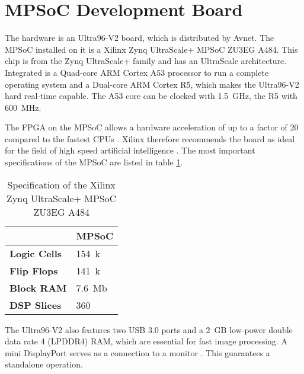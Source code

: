 \section{MPSoC Development Board}
\label{sec:board}

The hardware is an Ultra96-V2 board, which is distributed by Avnet.
The MPSoC installed on it is a Xilinx Zynq UltraScale+ MPSoC ZU3EG A484.
This chip is from the Zynq UltraScale+ family and has an UltraScale architecture.
Integrated is a Quad-core ARM Cortex A53 processor to run a complete operating system and a Dual-core ARM Cortex R5, which makes the Ultra96-V2 hard real-time capable.
The A53 core can be clocked with \SI{1.5}{GHz}, the R5 with \SI{600}{MHz}.

The FPGA on the MPSoC allows a hardware acceleration of up to a factor of 20 compared to the fastest CPUs \cite{acceleration_xilinx}.
Xilinx therefore recommends the board as ideal for the field of high speed artificial intelligence \cite{ai_resources_xilinx}.
The most important specifications of the MPSoC are listed in table \ref{tab:specs_MPSoC}.

\begin{table}[h]
	\caption{Specification of the Xilinx Zynq UltraScale+ MPSoC ZU3EG A484 \cite{xilinx_zynq}}
	\label{tab:specs_MPSoC}
	\centering
	\begin{tabular}{ll}
		\toprule
		& \textbf{MPSoC} \\
		\midrule
		\textbf{Logic Cells} & \SI{154}{k} \\
		\textbf{Flip Flops} & \SI{141}{k} \\
		\textbf{Block RAM} & \SI{7.6}{Mb} \\
		\textbf{DSP Slices} & 360 \\
		\bottomrule
	\end{tabular}
\end{table}

The Ultra96-V2 also features two USB 3.0 ports and a \SI{2}{GB} low-power double data rate 4 (LPDDR4) RAM, which are essential for fast image processing.
A mini DisplayPort serves as a connection to a monitor \cite{avnet_ultra96v2}.
This guarantees a standalone operation.
